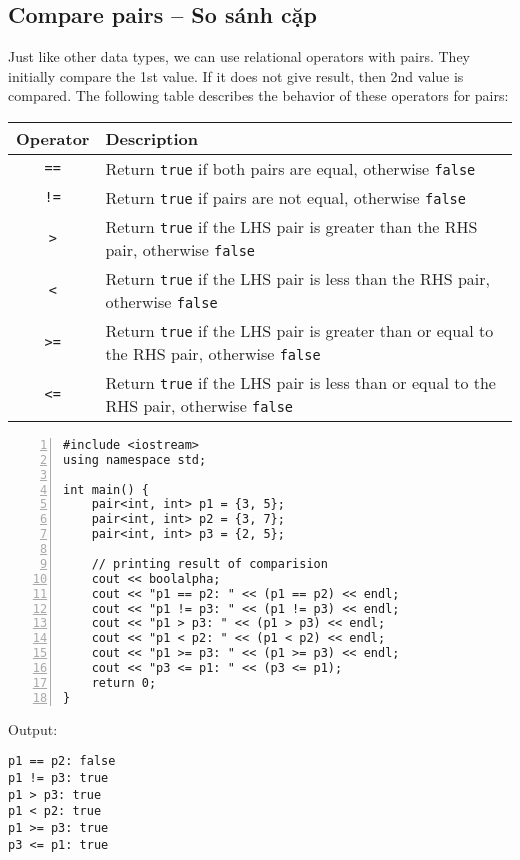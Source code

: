 \documentclass{article}
\begin{document}
\subsection{Compare pairs -- So sánh cặp}
Just like other data types, we can use relational operators with pairs. They initially compare the 1st value. If it does not give result, then 2nd value is compared. The following table describes the behavior of these operators for pairs:
\begin{table}[H]
	\centering
	\begin{tabular}{|c|l|}
		Operator & Description \\
		\hline
		{\tt==} & Return {\tt true} if both pairs are equal, otherwise {\tt false} \\
		\hline
		{\tt!=} & Return {\tt true} if pairs are not equal, otherwise {\tt false} \\
		\hline
		{\tt>} &  Return {\tt true} if the LHS pair is greater than the RHS pair, otherwise {\tt false} \\
		\hline
		{\tt<} & Return {\tt true} if the LHS pair is less than the RHS pair, otherwise {\tt false} \\
		\hline
		{\tt>=} & Return {\tt true} if the LHS pair is greater than or equal to the RHS pair, otherwise {\tt false} \\
		\hline
		{\tt<=} & Return {\tt true} if the LHS pair is less than or equal to the RHS pair, otherwise {\tt false} \\
		\hline
	\end{tabular}
\end{table}
\begin{Verbatim}[numbers=left,xleftmargin=5mm]
#include <iostream>
using namespace std;

int main() {
    pair<int, int> p1 = {3, 5};
    pair<int, int> p2 = {3, 7};
    pair<int, int> p3 = {2, 5};
	
    // printing result of comparision
    cout << boolalpha;
    cout << "p1 == p2: " << (p1 == p2) << endl;
    cout << "p1 != p3: " << (p1 != p3) << endl;
    cout << "p1 > p3: " << (p1 > p3) << endl;
    cout << "p1 < p2: " << (p1 < p2) << endl;
    cout << "p1 >= p3: " << (p1 >= p3) << endl;
    cout << "p3 <= p1: " << (p3 <= p1);
    return 0;
}
\end{Verbatim}
Output:
\begin{verbatim}
p1 == p2: false
p1 != p3: true
p1 > p3: true
p1 < p2: true
p1 >= p3: true
p3 <= p1: true
\end{verbatim}
\end{document}
